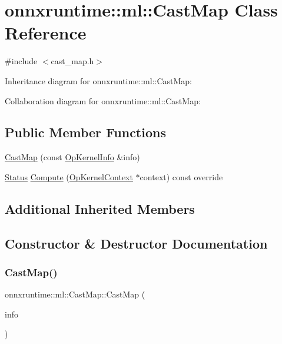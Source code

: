 \hypertarget{classonnxruntime_1_1ml_1_1CastMap}{}\section{onnxruntime\+:\+:ml\+:\+:Cast\+Map Class Reference}
\label{classonnxruntime_1_1ml_1_1CastMap}


{\ttfamily \#include $<$cast\+\_\+map.\+h$>$}



Inheritance diagram for onnxruntime\+:\+:ml\+:\+:Cast\+Map\+:


Collaboration diagram for onnxruntime\+:\+:ml\+:\+:Cast\+Map\+:
\subsection*{Public Member Functions}
\begin{DoxyCompactItemize}
\item 
\mbox{\hyperlink{classonnxruntime_1_1ml_1_1CastMap_a19c6aa50f03c69da642bc292b251d6fc}{Cast\+Map}} (const \mbox{\hyperlink{classonnxruntime_1_1OpKernelInfo}{Op\+Kernel\+Info}} \&info)
\item 
\mbox{\hyperlink{classonnxruntime_1_1common_1_1Status}{Status}} \mbox{\hyperlink{classonnxruntime_1_1ml_1_1CastMap_a9b304b1ab42b9ad49175196e58f74e12}{Compute}} (\mbox{\hyperlink{classonnxruntime_1_1OpKernelContext}{Op\+Kernel\+Context}} $\ast$context) const override
\end{DoxyCompactItemize}
\subsection*{Additional Inherited Members}


\subsection{Constructor \& Destructor Documentation}
\mbox{\label{classonnxruntime_1_1ml_1_1CastMap_a19c6aa50f03c69da642bc292b251d6fc}} 
\subsubsection{\texorpdfstring{Cast\+Map()}{CastMap()}}
{\footnotesize\ttfamily onnxruntime\+::ml\+::\+Cast\+Map\+::\+Cast\+Map (\begin{DoxyParamCaption}\item[{const \mbox{\hyperlink{classonnxruntime_1_1OpKernelInfo}{Op\+Kernel\+Info}} \&}]{info }\end{DoxyParamCaption})\hspace{0.3cm}{\ttfamily [inline]}}



